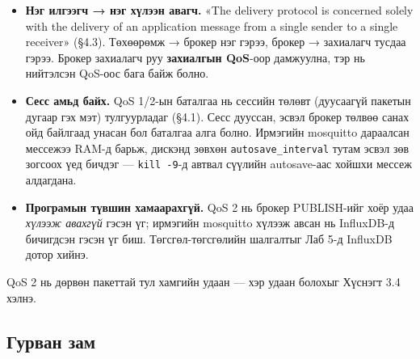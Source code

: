 \begin{itemize}
\tightlist
\item
  \textbf{Нэг илгээгч → нэг хүлээн авагч.} «The delivery protocol is concerned solely with the delivery of an application message from a single sender to a single receiver» (§4.3). Төхөөрөмж → брокер нэг гэрээ, брокер → захиалагч тусдаа гэрээ. Брокер захиалагч руу \textbf{захиалгын QoS}-оор дамжуулна, тэр нь нийтэлсэн QoS-оос бага байж болно.
\item
  \textbf{Сесс амьд байх.} QoS 1/2-ын баталгаа нь сессийн төлөвт (дуусаагүй пакетын дугаар гэх мэт) тулгуурладаг (§4.1). Сесс дууссан, эсвэл брокер төлвөө санах ойд байлгаад унасан бол баталгаа алга болно. Ирмэгийн mosquitto дараалсан мессежээ RAM-д барьж, дискэнд зөвхөн \texttt{autosave\_\allowbreak{}interval} тутам эсвэл зөв зогсоох үед бичдэг --- \texttt{kill\ -9}-д автвал сүүлийн autosave-аас хойшхи мессеж алдагдана.
\item
  \textbf{Програмын түвшин хамаарахгүй.} QoS 2 нь брокер PUBLISH-ийг хоёр удаа \emph{хүлээж авахгүй} гэсэн үг; ирмэгийн mosquitto хүлээж авсан нь InfluxDB-д бичигдсэн гэсэн үг биш. Төгсгөл-төгсгөлийн шалгалтыг Лаб 5-д InfluxDB дотор хийнэ.
\end{itemize}

QoS 2 нь дөрвөн пакеттай тул хамгийн удаан --- хэр удаан болохыг Хүснэгт 3.4 хэлнэ.

\hypertarget{ux433ux443ux440ux432ux430ux43d-ux437ux430ux43c}{%
\subsection{Гурван зам}\label{ux433ux443ux440ux432ux430ux43d-ux437ux430ux43c}}

